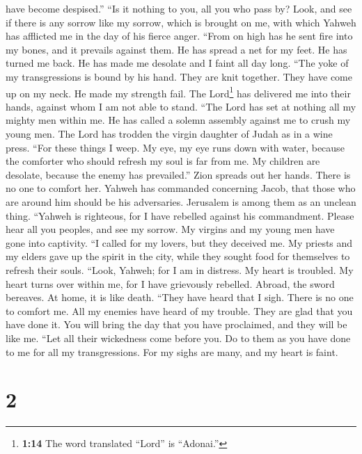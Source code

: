 have become despised.''  ``Is it nothing to you, all you
who pass by? Look, and see if there is any sorrow like my sorrow, which
is brought on me, with which Yahweh has afflicted me in the day of his
fierce anger.  ``From on high has he sent fire into my
bones, and it prevails against them. He has spread a net for my feet. He
has turned me back. He has made me desolate and I faint all day long.
 ``The yoke of my transgressions is bound by his hand.
They are knit together. They have come up on my neck. He made my
strength fail. The Lord\footnote{\textbf{1:14} The word translated
  ``Lord'' is ``Adonai.''} has delivered me into their hands, against
whom I am not able to stand.  ``The Lord has set at
nothing all my mighty men within me. He has called a solemn assembly
against me to crush my young men. The Lord has trodden the virgin
daughter of Judah as in a wine press.  ``For these things
I weep. My eye, my eye runs down with water, because the comforter who
should refresh my soul is far from me. My children are desolate, because
the enemy has prevailed.''  Zion spreads out her hands.
There is no one to comfort her. Yahweh has commanded concerning Jacob,
that those who are around him should be his adversaries. Jerusalem is
among them as an unclean thing.  ``Yahweh is righteous,
for I have rebelled against his commandment. Please hear all you
peoples, and see my sorrow. My virgins and my young men have gone into
captivity.  ``I called for my lovers, but they deceived
me. My priests and my elders gave up the spirit in the city, while they
sought food for themselves to refresh their souls. 
``Look, Yahweh; for I am in distress. My heart is troubled. My heart
turns over within me, for I have grievously rebelled. Abroad, the sword
bereaves. At home, it is like death.  ``They have heard
that I sigh. There is no one to comfort me. All my enemies have heard of
my trouble. They are glad that you have done it. You will bring the day
that you have proclaimed, and they will be like me. 
``Let all their wickedness come before you. Do to them as you have done
to me for all my transgressions. For my sighs are many, and my heart is
faint.

\hypertarget{section-1}{%
\section{2}\label{section-1}}

